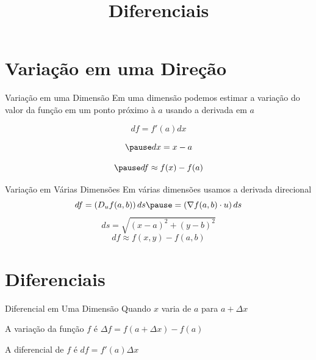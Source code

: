 \documentclass[fleqn,utf8,aspectratio=169,12pt]{beamer}
\title{Diferenciais}
\begin{document}
\addtitle

\section{Variação em uma Direção}

\begin{frame}{Variação em uma Dimensão}
  Em uma dimensão podemos estimar a variação do valor da função
  em um ponto próximo à $a$ usando a derivada em $a$

  \pause
  \[
    df = f'(a) dx
  \]

  \[
    \pause
    dx = x - a
  \]

  \[
    \pause
    df \approx f(x) - f(a)
  \]
\end{frame}

\begin{frame}{Variação em Várias Dimensões}
  Em várias dimensões usamos a derivada direcional
  \pause
  \[
    df
    = \left(D_u f(a, b){}\right) ds
    \pause
    = \left(\nabla f(a, b){} \cdot u\right) ds
  \]
  \pause
  \[
    ds = \sqrt{(x - a)^2 + (y-b)^2}
  \]
  \pause
  \[
    df \approx f(x, y) - f(a, b)
  \]
\end{frame}



\section{Diferenciais}

\begin{frame}{Diferencial em Uma Dimensão}
  Quando $x$ varia de $a$ para
  \tabto{55mm}\(a+\Delta x\)

  \pause
  \vspace{\baselineskip}
  A variação da função $f$ é
  \tabto{55mm}\(\Delta f = f(a + \Delta x) - f(a)\)

  \pause
  \vspace{\baselineskip}
  A diferencial de $f$ é
  \tabto{55mm}\(df = f'(a) \Delta x\)
\end{frame}
\end{document}
